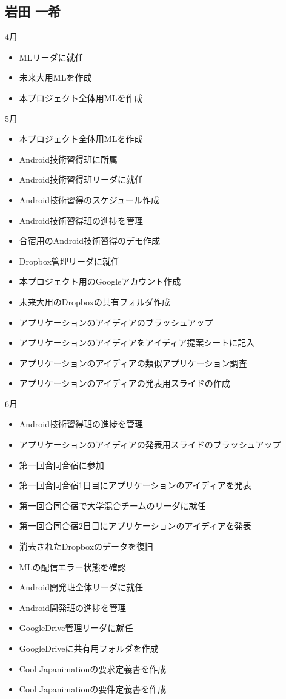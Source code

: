 \subsection{岩田 一希}
4月
\begin{itemize}
\item MLリーダに就任
\item 未来大用MLを作成
\item 本プロジェクト全体用MLを作成
\end{itemize}
5月
\begin{itemize}
\item 本プロジェクト全体用MLを作成
\item Android技術習得班に所属
\item Android技術習得班リーダに就任
\item Android技術習得のスケジュール作成
\item Android技術習得班の進捗を管理
\item 合宿用のAndroid技術習得のデモ作成
\item Dropbox管理リーダに就任
\item 本プロジェクト用のGoogleアカウント作成
\item 未来大用のDropboxの共有フォルダ作成
\item アプリケーションのアイディアのブラッシュアップ
\item アプリケーションのアイディアをアイディア提案シートに記入
\item アプリケーションのアイディアの類似アプリケーション調査
\item アプリケーションのアイディアの発表用スライドの作成
\end{itemize}
6月
\begin{itemize}
\item Android技術習得班の進捗を管理
\item アプリケーションのアイディアの発表用スライドのブラッシュアップ
\item 第一回合同合宿に参加
\item 第一回合同合宿1日目にアプリケーションのアイディアを発表
\item 第一回合同合宿で大学混合チームのリーダに就任
\item 第一回合同合宿2日目にアプリケーションのアイディアを発表
\item 消去されたDropboxのデータを復旧
\item MLの配信エラー状態を確認
\item Android開発班全体リーダに就任
\item Android開発班の進捗を管理
\item GoogleDrive管理リーダに就任
\item GoogleDriveに共有用フォルダを作成
\item Cool Japanimationの要求定義書を作成
\item Cool Japanimationの要件定義書を作成
\end{itemize}
